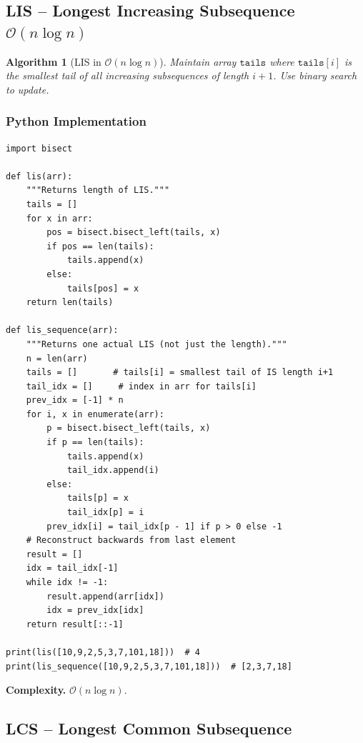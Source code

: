 \documentclass[10pt,a4paper]{article}
\theoremstyle{cpstyle}
\newtheorem{algorithm}[theorem]{Algorithm}
\newcommand{\bigO}[1]{\mathcal{O}\!\left(#1\right)}
\begin{document}
\subsection{LIS -- Longest Increasing Subsequence $\bigO{n \log n}$}

\begin{algorithm}[LIS in $\bigO{n \log n}$]
Maintain array $\mathtt{tails}$ where $\mathtt{tails}[i]$ is the smallest tail of all increasing subsequences of length $i+1$. Use binary search to update.
\end{algorithm}

\subsubsection{Python Implementation}
\begin{lstlisting}[caption={LIS O(n log n) with patience sorting}]
import bisect

def lis(arr):
    """Returns length of LIS."""
    tails = []
    for x in arr:
        pos = bisect.bisect_left(tails, x)
        if pos == len(tails):
            tails.append(x)
        else:
            tails[pos] = x
    return len(tails)

def lis_sequence(arr):
    """Returns one actual LIS (not just the length)."""
    n = len(arr)
    tails = []       # tails[i] = smallest tail of IS length i+1
    tail_idx = []     # index in arr for tails[i]
    prev_idx = [-1] * n
    for i, x in enumerate(arr):
        p = bisect.bisect_left(tails, x)
        if p == len(tails):
            tails.append(x)
            tail_idx.append(i)
        else:
            tails[p] = x
            tail_idx[p] = i
        prev_idx[i] = tail_idx[p - 1] if p > 0 else -1
    # Reconstruct backwards from last element
    result = []
    idx = tail_idx[-1]
    while idx != -1:
        result.append(arr[idx])
        idx = prev_idx[idx]
    return result[::-1]

print(lis([10,9,2,5,3,7,101,18]))  # 4
print(lis_sequence([10,9,2,5,3,7,101,18]))  # [2,3,7,18]
\end{lstlisting}

\textbf{Complexity.} $\bigO{n \log n}$.

\subsection{LCS -- Longest Common Subsequence}
\end{document}

